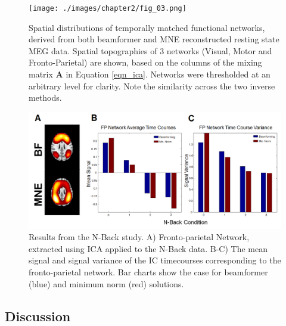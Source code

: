 \begin{figure}[h!]
	\begin{centering}
		\texttt{[image: ./images/chapter2/fig\_03.png]}
		\caption{Spatial distributions of temporally matched functional networks, derived from both beamformer and MNE reconstructed resting state MEG data. Spatial topographies of 3 networks (Visual, Motor and Fronto-Parietal) are shown, based on the columns of the mixing matrix \textbf{A} in Equation \ref{eqn_ica}. Networks were thresholded at an arbitrary level for clarity.  Note the similarity across the two inverse methods.}\label{fig_bf_mn_4}
		\end{centering}
	\end{figure}

\begin{figure}[h!]
	\begin{centering}
		\includegraphics[width=\textwidth]{./images/chapter2/Nback.png}
		\caption{Results from the N-Back study. A) Fronto-parietal Network, extracted using ICA applied to the N-Back data. B-C) The mean signal and signal variance of the IC timecourses corresponding to the fronto-parietal network. Bar charts show the case for beamformer (blue) and minimum norm (red) solutions.
			}\label{fig_bf_mn_5}
		\end{centering}
	\end{figure}
	
	\clearpage	
\subsection{Discussion}

